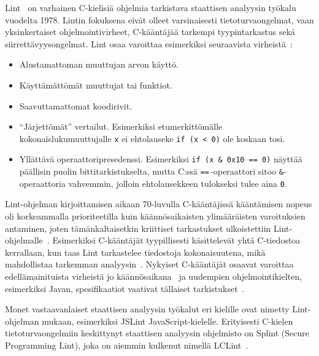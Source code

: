 Lint~\cite{Lint} on varhainen C-kielisiä ohjelmia tarkistava staattisen analyysin työkalu vuodelta 1978.
Lintin fokuksena eivät olleet varsinaisesti tietoturvaongelmat,
vaan yksinkertaiset ohjelmointivirheet, C-kääntäjää tarkempi tyypintarkastus sekä siirrettävyysongelmat.
Lint osaa varoittaa esimerkiksi seuraavista virheistä~\cite{Lint}:

\begin{itemize}
    \item Alustamattoman muuttujan arvon käyttö.
    \item Käyttämättömät muuttujat tai funktiot.
    \item Saavuttamattomat koodirivit.
    \item ``Järjettömät'' vertailut.
           Esimerkiksi etumerkittömälle kokonaislukumuuttujalle \texttt{x} ei ehtolauseke
           \texttt{if (x < 0)} ole koskaan tosi.
   \item Yllättävä operaattoripresedenssi.
         Esimerkiksi \texttt{if (x \& 0x10 == 0)} näyttää päällisin puolin bittitarkistukselta,
         mutta C:ssä \texttt{==}\,-operaattori sitoo \texttt{\&}-operaattoria vahvemmin,
         jolloin ehtolausekkeen tulokseksi tulee aina \texttt{0}.
\end{itemize}

Lint-ohjelman kirjoittamisen aikaan 70-luvulla C-kääntäjissä kääntämisen nopeus oli
korkeammalla prioriteetilla kuin käännösaikaisten ylimääräisten varoituksien antaminen,
joten tämänkaltaisetkin kriittiset tarkastukset ulkoistettiin Lint-ohjelmalle~\cite{Lint}.
Esimerkiksi C-kääntäjät tyypillisesti käsittelevät yhtä C-tiedostoa kerrallaan,
kun taas Lint tarkastelee tiedostoja kokonaisuutena,
mikä mahdollistaa tarkemman analyysin~\cite{Lint}.
Nykyiset C-kääntäjät osaavat varoittaa e\-del\-lä\-mai\-ni\-tuis\-ta virheistä
jo käännösaikana~\cite{SecurityRootOfTheProblem} ja uudempien ohjelmointikielten,
esimerkiksi Javan, spesifikaatiot vaativat tällaiset tarkistukset~\cite[22.3]{Sommerville}.

Monet vastaavanlaiset staattisen analyysin työkalut eri kielille ovat nimetty
Lint-ohjelman mukaan, esimerkiksi JSLint JavaScript-kielelle.
Erityisesti C-kielen tietoturvaongelmiin keskittynyt staattisen analyysin ohjelmisto on Splint
(Secure Programming Lint), joka on aiemmin kulkenut nimellä LCLint~\cite{SplintLCLint}.

